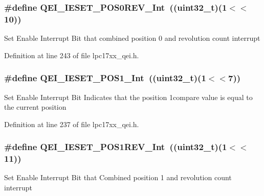 \hypertarget{group___q_e_i___private___macros_ga06a002b9ecc627a51ee4c43483ade601}{
\subsubsection[{\-Q\-E\-I\-\_\-\-I\-E\-S\-E\-T\-\_\-\-P\-O\-S0\-R\-E\-V\-\_\-\-Int}]{\setlength{\rightskip}{0pt plus 5cm}\#define {\bf \-Q\-E\-I\-\_\-\-I\-E\-S\-E\-T\-\_\-\-P\-O\-S0\-R\-E\-V\-\_\-\-Int}~((uint32\-\_\-t)(1$<$$<$10))}}\label{group___q_e_i___private___macros_ga06a002b9ecc627a51ee4c43483ade601}
\-Set \-Enable \-Interrupt \-Bit that combined position 0 and revolution count interrupt 

\-Definition at line 243 of file lpc17xx\-\_\-qei.\-h.

\hypertarget{group___q_e_i___private___macros_gaab604fdd70e70d587d83f7e0365311dc}{
\subsubsection[{\-Q\-E\-I\-\_\-\-I\-E\-S\-E\-T\-\_\-\-P\-O\-S1\-\_\-\-Int}]{\setlength{\rightskip}{0pt plus 5cm}\#define {\bf \-Q\-E\-I\-\_\-\-I\-E\-S\-E\-T\-\_\-\-P\-O\-S1\-\_\-\-Int}~((uint32\-\_\-t)(1$<$$<$7))}}\label{group___q_e_i___private___macros_gaab604fdd70e70d587d83f7e0365311dc}
\-Set \-Enable \-Interrupt \-Bit \-Indicates that the position 1compare value is equal to the current position 

\-Definition at line 237 of file lpc17xx\-\_\-qei.\-h.

\hypertarget{group___q_e_i___private___macros_gacef8f04aaef9481b006252c7865f4a63}{
\subsubsection[{\-Q\-E\-I\-\_\-\-I\-E\-S\-E\-T\-\_\-\-P\-O\-S1\-R\-E\-V\-\_\-\-Int}]{\setlength{\rightskip}{0pt plus 5cm}\#define {\bf \-Q\-E\-I\-\_\-\-I\-E\-S\-E\-T\-\_\-\-P\-O\-S1\-R\-E\-V\-\_\-\-Int}~((uint32\-\_\-t)(1$<$$<$11))}}\label{group___q_e_i___private___macros_gacef8f04aaef9481b006252c7865f4a63}
\-Set \-Enable \-Interrupt \-Bit that \-Combined position 1 and revolution count interrupt 

